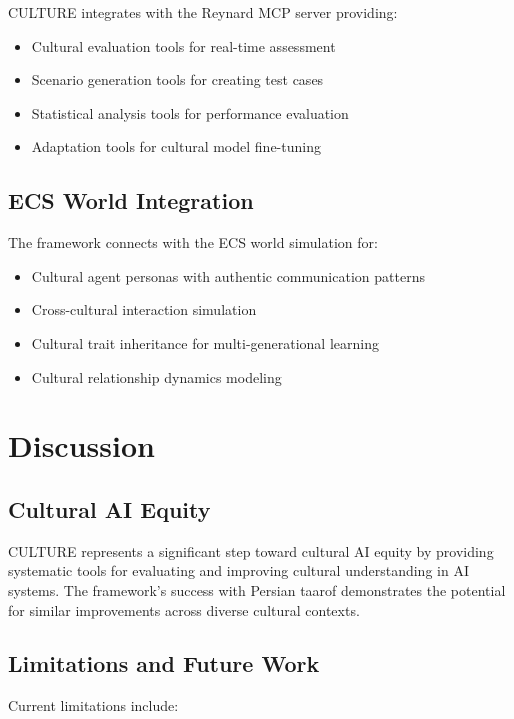 \documentclass[11pt,twocolumn]{article}
\begin{document}
CULTURE integrates with the Reynard MCP server providing:

\begin{itemize}
    \item Cultural evaluation tools for real-time assessment
    \item Scenario generation tools for creating test cases
    \item Statistical analysis tools for performance evaluation
    \item Adaptation tools for cultural model fine-tuning
\end{itemize}

\subsection{ECS World Integration}

The framework connects with the ECS world simulation for:

\begin{itemize}
    \item Cultural agent personas with authentic communication patterns
    \item Cross-cultural interaction simulation
    \item Cultural trait inheritance for multi-generational learning
    \item Cultural relationship dynamics modeling
\end{itemize}

\section{Discussion}

\subsection{Cultural AI Equity}

CULTURE represents a significant step toward cultural AI equity by providing systematic tools for evaluating and improving cultural understanding in AI systems. The framework's success with Persian taarof demonstrates the potential for similar improvements across diverse cultural contexts.

\subsection{Limitations and Future Work}

Current limitations include:
\end{document}
